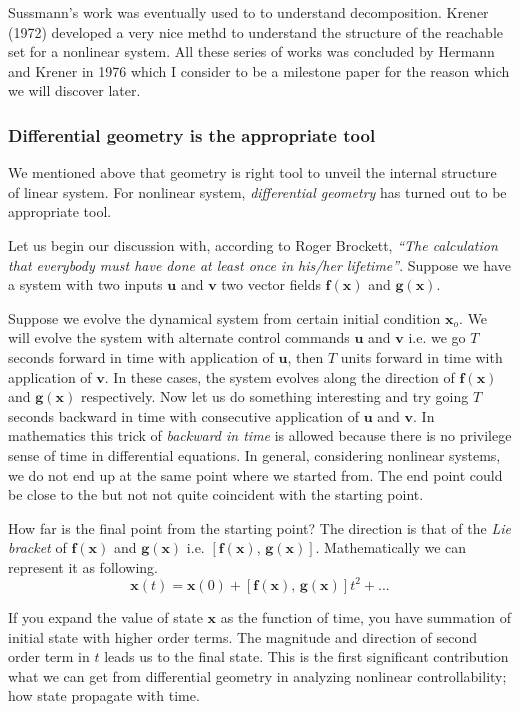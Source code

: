 \documentclass{article}
\begin{document}
Sussmann's work was eventually used to to understand decomposition. Krener (1972) developed a very nice methd to understand the structure of the reachable set for a nonlinear system. All these series of works was concluded by Hermann and Krener in 1976 which I consider to be a milestone paper for the reason which we will discover later.

\noindent
\subsubsection*{Differential geometry is the appropriate tool}
We mentioned above that geometry is right tool to unveil the internal structure of linear system. For nonlinear system, \textit{differential geometry} has turned out to be appropriate tool.

Let us begin our discussion with, according to Roger Brockett, \textit{``The calculation that everybody must have done at least once in his/her lifetime''}. Suppose we have a system with two inputs $\bm{u}$ and $\bm{v}$ two vector fields $\bm{f}(\bm{x})$ and $\bm{g}(\bm{x})$. 

Suppose we evolve the dynamical system from certain initial condition $\bm{x}_{o}$. We will evolve the system with alternate control commands $\bm{u}$ and $\bm{v}$ i.e. we go $T$ seconds forward in time with application of $\bm{u}$, then $T$ units forward in time with application of $\bm{v}$. In these cases, the system evolves along the direction of $\bm{f}(\bm{x})$ and $\bm{g}(\bm{x})$ respectively. Now let us do something interesting and try going $T$ seconds backward in time with consecutive application of $\bm{u}$ and $\bm{v}$. In mathematics this trick of \textit{backward in time} is allowed because there is no privilege sense of time in differential equations. In general, considering nonlinear systems, we do not end up at the same point where we started from. The end point could be close to the but not not quite coincident with the starting point.

How far is the final point from the starting point? The direction is that of the \textit{Lie bracket} of $\bm{f}(\bm{x})$ and $\bm{g}(\bm{x})$ i.e. $[\bm{f}(\bm{x}),\,\bm{g}(\bm{x})]$. Mathematically we can represent it as following.
$$
\bm{x}(t)=\bm{x}(0)+[\bm{f}(\bm{x}),\,\bm{g}(\bm{x})]t^{2}+...
$$

If you expand the value of state $\bm{x}$ as the function of time, you have summation of initial state with higher order terms. The magnitude and direction of second order term in $t$ leads us to the final state. This is the first significant contribution what we can get from differential geometry in analyzing nonlinear controllability; how state propagate with time.
\end{document}
